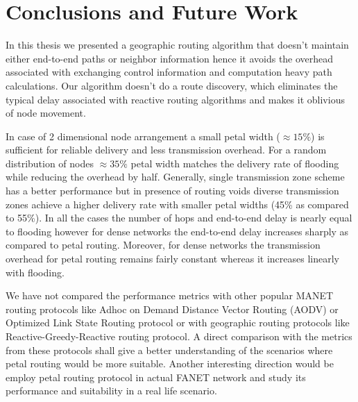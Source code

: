 \chapter{Conclusions and Future Work}
\label{chap-six}

In this thesis we presented a geographic routing algorithm that doesn't maintain either end-to-end paths or neighbor information hence it avoids the overhead associated with exchanging control information and computation heavy path calculations. Our algorithm doesn't do a route discovery, which eliminates the typical delay associated with reactive routing algorithms and makes it oblivious of node movement. 

In case of 2 dimensional node arrangement a small petal width ($\approx 15\%$) is sufficient for reliable delivery and less transmission overhead. For a random distribution of nodes $\approx 35 \% $ petal width matches the delivery rate of flooding while reducing the overhead by half. Generally, single transmission zone scheme has a better performance but in presence of routing voids diverse transmission zones achieve a higher delivery rate with smaller petal widths (45\% as compared to 55\%). In all the cases the number of hops and end-to-end delay is nearly equal to flooding however for dense networks the end-to-end delay increases sharply as compared to petal routing. Moreover, for dense networks the transmission overhead for petal routing remains fairly constant whereas it increases linearly with flooding. 

We have not compared the performance metrics with other popular MANET routing protocols like Adhoc on Demand Distance Vector Routing (AODV) or Optimized Link State Routing protocol or with geographic routing protocols like Reactive-Greedy-Reactive routing protocol. A direct comparison with the metrics from these protocols shall give a better understanding of the scenarios where petal routing would be more suitable. Another interesting direction would be employ petal routing protocol in actual FANET network and study its performance and suitability in a real life scenario.